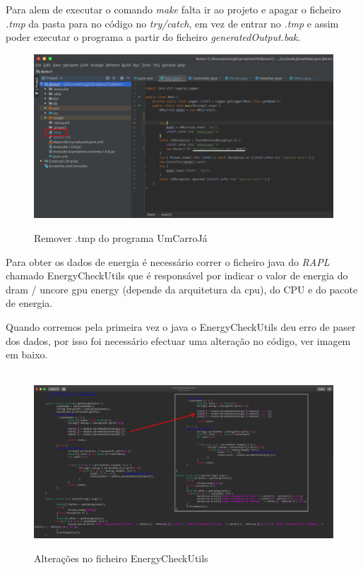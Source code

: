 Para alem de executar o comando \textit{make} falta ir ao projeto e apagar o ficheiro \textit{.tmp} da pasta para no código no \textit{try/catch}, em vez de entrar no \textit{.tmp} e assim poder executar o programa a partir do ficheiro \textit{generatedOutput.bak}.


\begin{figure}[H]
    \centering
    \includegraphics[width=1.2\textwidth]{images/remove_tmp.png}
    \label{fig49}
    \caption{Remover .tmp do programa UmCarroJá}
\end{figure}

Para obter os dados de energia é necessário correr o ficheiro java do \textit{RAPL} chamado EnergyCheckUtils que é responsável por indicar o valor de energia do dram / uncore gpu energy (depende da arquitetura da cpu), do CPU e do pacote de energia.

Quando corremos pela primeira vez o java o EnergyCheckUtils deu erro de paser dos dados, por isso foi necessário efectuar uma alteração no código, ver imagem em baixo.

\begin{figure}[H]
    \hbox{\hspace{-8em} \includegraphics[width=1.5\textwidth]{images/energycheckutils.png}}
    \label{fig50}
    \caption{Alterações no ficheiro EnergyCheckUtils}
\end{figure}

